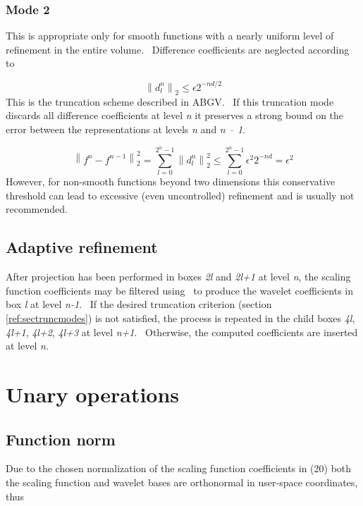 \documentclass[letterpaper]{article}
\begin{document}
\subsubsection{Mode 2}
This is appropriate only for smooth functions with a nearly uniform level of refinement in the entire volume.
\ Difference coefficients are neglected according to 

\begin{equation}
\left\|d_{l}^{n}\right\|_{2}\le \epsilon 2^{-nd/2}
\end{equation}
This is the truncation scheme described in ABGV. \ If this truncation mode discards all difference coefficients at level
\textit{n} it preserves a strong bound on the error between the representations at levels \textit{n} and \textit{n --
1}. 

\begin{equation}
\left\|f^{n}-f^{n-1}\right\|_{2}^{2}=\sum _{l=0}^{2^{n}-1}\left\|d_{l}^{n}\right\|_{2}^{2}\le \sum
_{l=0}^{2^{n}-1}\epsilon ^{2}2^{-nd}=\epsilon ^{2}
\end{equation}
However, for non-smooth functions beyond two dimensions this conservative threshold can lead to excessive (even
uncontrolled) refinement and is usually not recommended.

\subsection{Adaptive refinement}
After projection has been performed in boxes \textit{2l} and \textit{2l+1} at level \textit{n}, the scaling function
coefficients may be filtered using \ to produce the wavelet coefficients in box \textit{l} at level \textit{n-1}. \ If
the desired truncation criterion (section \ref{ref:sectruncmodes}) is not satisfied, the process is repeated in the
child boxes \textit{4l}, \textit{4l+1}, \textit{4l+2}, \textit{4l+3} at level \textit{n+1}. \ Otherwise, the computed
coefficients are inserted at level \textit{n}.

\section[Unary operations]{\rmfamily Unary operations}
\subsection[Function norm]{\rmfamily Function norm}
Due to the chosen normalization of the scaling function coefficients in (20) both the scaling function and wavelet bases
are orthonormal in user-space coordinates, thus 
\end{document}
